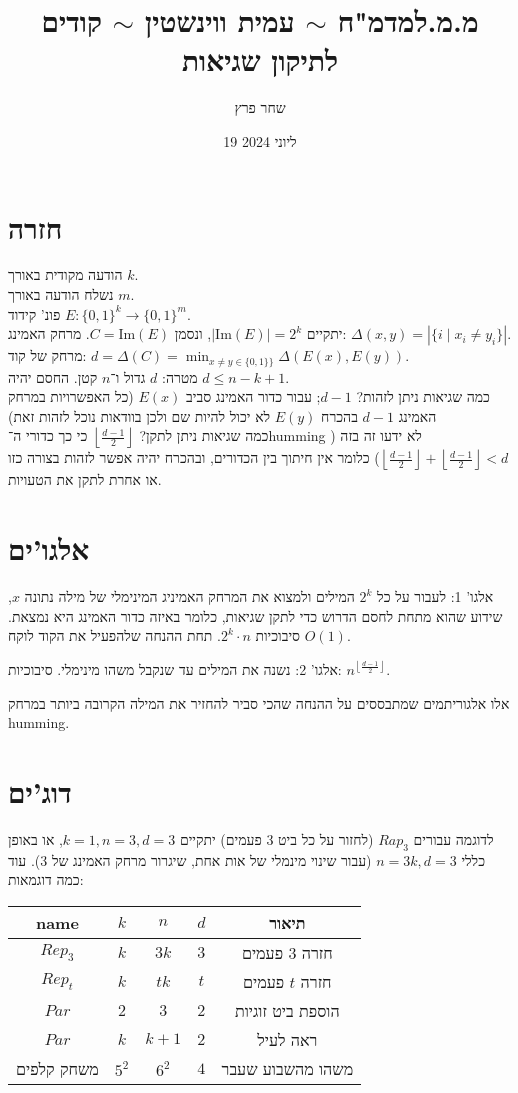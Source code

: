 \documentclass[]{article}
\author{שחר פרץ}
\title{מ.מ.למדמ"ח $\sim$ עמית ווינשטין $\sim$ קודים לתיקון שגיאות}
\date{19 ליוני 2024}
\newcommand\Img   {\mathrm{Im}}
\newcommand\rf    {\right\rfloor}
\newcommand\lf    {\left\lfloor}
\begin{document}
	\maketitle
	\section{חזרה}
	הודעה מקודית באורך $k$. \\
	נשלח הודעה באורך $m$. \\
	פונ' קידוד $E \colon \{0, 1\}^{k} \to \{0, 1\}^{m}$. \\
	יתקיים $|\Img(E)| = 2^{k}$, ונסמן $C = \Img(E)$. 
	מרחק האמינג: $\Delta(x, y) = |\{i \mid x_i \neq y_i\}|$. \\
	מרחק של קוד: $d = \Delta(C) = \min_{x \neq y \in \{0, 1\}\}} \Delta(E(x), E(y))$. \\
	מטרה: $d$ גדול ו־$n$ קטן. החסם יהיה $d \le n - k + 1$. \\
	כמה שגיאות ניתן לזהות? $d - 1$; עבור כדור האמינג סביב $E(x)$ (כל האפשרויות במרחק האמינג $d - 1$ בהכרח $E(y)$ לא יכול להיות שם ולכן בוודאות נוכל לזהות זאת) \\
	כמה שגיאות ניתן לתקן? $\lf \frac{d - 1}{2} \rf$ כי כך כדורי ה־humming לא ידעו זה בזה ($\lf \frac{d - 1 }{2} \rf + \lf \frac{d - 1}{2} \rf < d$) כלומר אין חיתוך בין הכדורים, ובהכרח יהיה אפשר לזהות בצורה כזו או אחרת לתקן את הטעויות. 
	
	\section{אלגו'ים}
	אלגו' 1: לעבור על כל $2^k $ המילים ולמצוא את המרחק האמיניג המינימלי של מילה נתונה $x$, שידוע שהוא מתחת לחסם הדרוש כדי לתקן שגיאות, כלומר באיזה כדור האמינג היא נמצאת. סיבוכיות $2^k \cdot n$. תחת ההנחה שלהפעיל את הקוד לוקח $O(1)$. 
	
	אלגו' 2: נשנה את המילים עד שנקבל משהו מינימלי. סיבוכיות: $n^{\lf \frac{d - 1}{2}\rf}$. 
	
	אלו אלגוריתמים שמתבססים על ההנחה שהכי סביר להחזיר את המילה הקרובה ביותר במרחק humming. 
	
	\section{דוג'ים}
	לדוגמה עבורים $Rap_3$ (לחזור על כל ביט 3 פעמים) יתקיים $k = 1, n = 3, d = 3$, או באופן כללי $n = 3k, d = 3$ (עבור שינוי מינמלי של אות אחת, שיגרור מרחק האמינג של 3). עוד כמה דוגמאות: 
	\begin{center}
		\begin{tabular}{|c|ccc|c|} \hline
			name & $k$ &$n$ &$d$ &תיאור  \\ \hline 
			$Rep_3$ & $k$ & $3k$ & $3$ &חזרה 3 פעמים\\ \hline 
			$Rep_t$ & $k$ & $tk$ & $t$ &חזרה $t$ פעמים \\ \hline
			$Par$ & $2$ & $3$ & $2$ &הוספת ביט זוגיות \\ \hline
			$Par$ & $k$ & $k + 1$ & $2$ & ראה לעיל \\ \hline
			משחק קלפים & $5^2$ & $6^2$ & $4$ & משהו מהשבוע שעבר \\ \hline
		\end{tabular}
	\end{center}
	
\end{document}
